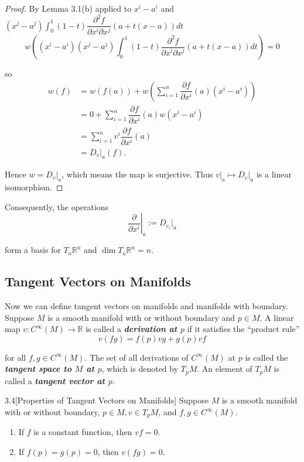 \begin{proof}
    By Lemma 3.1(b) applied to \( x^{i} - a^{i} \) and \( (x^{j} - a^{j}) \int_{0}^{1}(1 - t)\dfrac{\partial^{2}f}{\partial x^{i}\partial x^{j}}(a + t(x - a)) dt \)
    \[
        w\left((x^{i} - a^{i})(x^{j} - a^{j}) \int_{0}^{1}(1 - t)\dfrac{\partial^{2}f}{\partial x^{i}\partial x^{j}}(a + t(x - a)) dt\right) = 0
    \]

    so
    \begingroup
    \allowdisplaybreaks%
    \begin{align*}
        w(f) & = w(f(a)) + w\left(\sum_{i=1}^{n}\dfrac{\partial f}{\partial x^{i}}(a) (x^{i} - a^{i}) \right) \\
             & = 0 + \sum_{i=1}^{n} \dfrac{\partial f}{\partial x^{i}}(a) w(x^{i} - a^{i})                    \\
             & = \sum_{i=1}^{n} v^{i}\dfrac{\partial f}{\partial x^{i}}(a)                                    \\
             & = D_{v}\vert_{a}(f).
    \end{align*}
    \endgroup

    Hence \( w = D_{v}\vert_{a} \), which means the map is surjective. Thus \( v\vert_{a} \mapsto D_{v}\vert_{a} \) is a linear isomorphism.
\end{proof}

Consequently, the operations
\[
    \left.\dfrac{\partial}{\partial x^{i}}\right\vert_{a} := D_{e_{i}}\vert_{a}
\]

form a basis for \( T_{a}\mathbb{R}^{n} \) and \( \dim T_{a}\mathbb{R}^{n} = n \).

\subsection{Tangent Vectors on Manifolds}

Now we can define tangent vectors on manifolds and manifolds with boundary. Suppose \( M \) is a smooth manifold with or without boundary and \( p \in M \). A linear map \( v: C^{\infty}(M) \to \mathbb{R} \) is called a \emph{\textbf{derivation at \( p \)}} if it satisfies the ``product rule''
\[
    v(fg) = f(p)vg + g(p)vf
\]

for all \( f, g \in C^{\infty}(M) \). The set of all derivations of \( C^{\infty}(M) \) at \( p \) is called the \emph{\textbf{tangent space to \( M \) at \( p \)}}, which is denoted by \( T_{p}M \). An element of \( T_{p}M \) is called a \emph{\textbf{tangent vector at \( p \)}}.

\begin{lemma}{3.4}[Properties of Tangent Vectors on Manifolds]
    Suppose \( M \) is a smooth manifold with or without boundary, \( p \in M, v \in T_{p}M \), and \( f, g \in C^{\infty}(M) \).
    \begin{enumerate}[label={(\alph*)},itemsep=0pt,topsep=0pt]
        \item If \( f \) is a constant function, then \( vf = 0 \).
        \item If \( f(p) = g(p) = 0 \), then \( v(fg) = 0 \).
    \end{enumerate}
\end{lemma}

